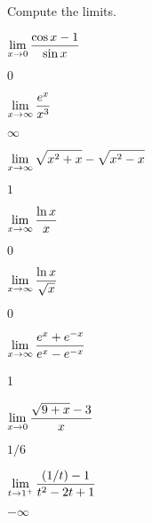 \begin{exercises}

Compute the limits.

\twocol

\begin{exercise} $\displaystyle\lim_{x\to 0} {\cos x -1\over \sin x}$
\begin{answer} $0$
\end{answer}\end{exercise}

\begin{exercise} $\displaystyle\lim_{x\to \infty} {e^x\over x^3}$
\begin{answer} $\infty$
\end{answer}\end{exercise}

\begin{exercise} $\displaystyle\lim_{x\to \infty} \sqrt{x^2+x}-\sqrt{x^2-x}$
\begin{answer} $1$
\end{answer}\end{exercise}

\begin{exercise} $\displaystyle\lim_{x\to \infty} {\ln x\over x}$
\begin{answer} $0$
\end{answer}\end{exercise}

\begin{exercise} $\displaystyle\lim_{x\to \infty} {\ln x\over \sqrt{x}}$
\begin{answer} $0$
\end{answer}\end{exercise}

\begin{exercise} $\displaystyle\lim_{x\to\infty} {e^x + e^{-x}\over e^x -e^{-x}}$
\begin{answer} 1
\end{answer}\end{exercise}

\begin{exercise} $\displaystyle\lim_{x\to0}{\sqrt{9+x}-3\over x}$
\begin{answer} $1/6$
\end{answer}\end{exercise}

\begin{exercise} $\displaystyle\lim_{t\to1^+}{(1/t)-1\over t^2-2t+1}$
\begin{answer} $-\infty$
\end{answer}\end{exercise}


\end{exercises}
